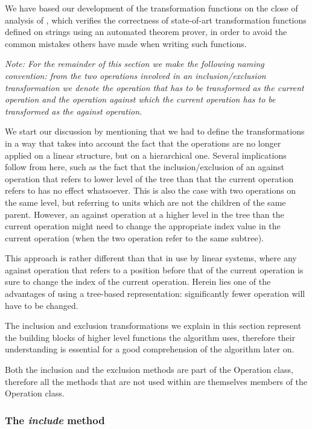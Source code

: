 We have based our development of the transformation functions on the close of analysis
of \cite{imine03}, which verifies the correctness of state-of-art transformation
functions defined on strings using an automated theorem prover, in order to avoid
the common mistakes others have made when writing such functions.

\emph{Note: For the remainder of this section we make the following naming convention:
from the two operations involved in an inclusion/exclusion transformation we denote
the operation that has to be transformed as the \emph{current operation} and the
operation against which the current operation has to be transformed as the
\emph{against operation}.}

We start our discussion by mentioning that we had to define the transformations
in a way that takes into account the fact that the operations are no longer applied
on a linear structure, but on a hierarchical one. Several implications follow from here,
such as the fact that the inclusion/exclusion of an against operation that refers
to lower level of the tree than that the current operation refers to has no effect whatsoever.
This is also the case with two operations on the same level, but referring to
units which are not the children of the same parent. However, an against operation
at a higher level in the tree than the current operation might need to change the
appropriate index value in the current operation (when the two operation refer to
the same subtree).

This approach is rather different than that in use by linear systems, where any
against operation that refers to a position before that of the current operation
is sure to change the index of the current operation. Herein lies one of the advantages
of using a tree-based representation: significantly fewer operation will have to
be changed.

The inclusion and exclusion transformations we explain in this section represent
the building blocks of higher level functions the algorithm uses, therefore their
understanding is essential for a good comprehension of the algorithm later on.

Both the inclusion and the exclusion methods are part of the Operation class, therefore
all the methods that are not used within are themselves members of the Operation class.

\subsubsection{The \emph{include} method}

